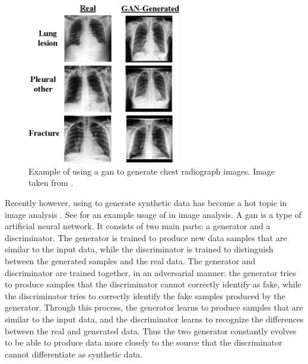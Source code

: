 \documentclass[12pt, letterpaper]{article}
\begin{document}
\begin{figure}[t]
    \centering
    \includegraphics[width=0.6\textwidth]{figures/gan-xray.png}
    \caption{Example of using a \acrfull{gan} to generate chest radiograph images. Image taken from \cite{sundaram_gan-based_2021}.}
    \label{fig:gan-xray}
\end{figure}

Recently however, using  to generate synthetic data has become a hot topic in image analysis \cite{pavan_kumar_generative_2021}. See  for an example usage of  in image analysis. A \acrshort{gan} is a type of artificial neural network. It consists of two main parts: a generator and a discriminator. The generator is trained to produce new data samples that are similar to the input data, while the discriminator is trained to distinguish between the generated samples and the real data. The generator and discriminator are trained together, in an adversarial manner: the generator tries to produce samples that the discriminator cannot correctly identify as fake, while the discriminator tries to correctly identify the fake samples produced by the generator. Through this process, the generator learns to produce samples that are similar to the input data, and the discriminator learns to recognize the differences between the real and generated data. Thus the two generator constantly evolves to be able to produce data more closely to the source that the discriminator cannot differentiate as synthetic data.


\end{document}
